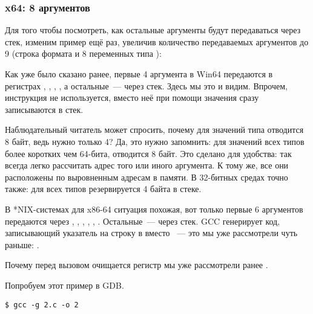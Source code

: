 \subsubsection{x64: 8 аргументов}

\label{example_printf8_x64}
Для того чтобы посмотреть, как остальные аргументы будут передаваться через стек, 
изменим пример ещё раз, 
увеличив количество передаваемых аргументов до 9 
(строка формата \printf и 8 переменных типа \Tint):




Как уже было сказано ранее, первые 4 аргумента в Win64 передаются в регистрах \RCX, \RDX, , , а остальные~--- через стек.
Здесь мы это и видим.
Впрочем, инструкция \PUSH не используется, вместо неё при помощи \MOV значения сразу записываются в стек.



Наблюдательный читатель может спросить, почему для значений типа \Tint отводится 8 байт, ведь нужно только 4?
Да, это нужно запомнить: для значений всех типов более коротких чем 64-бита, отводится 8 байт.
Это сделано для удобства: так всегда легко рассчитать адрес того или иного аргумента.
К тому же, все они расположены по выровненным адресам в памяти.
В 32-битных средах точно также: для всех типов резервируется 4 байта в стеке.



В *NIX-системах для x86-64 ситуация похожая, вот только первые 6 аргументов передаются через
\RDI, \RSI, \RDX, \RCX, , .
Остальные~--- через стек.
GCC генерирует код, записывающий указатель на строку в \EDI вместо \RDI~--- 
это мы уже рассмотрели чуть раньше: .

Почему перед вызовом \printf очищается регистр \EAX мы уже рассмотрели ранее .




Попробуем этот пример в \ac{GDB}.

\begin{lstlisting}
$ gcc -g 2.c -o 2
\end{lstlisting}

